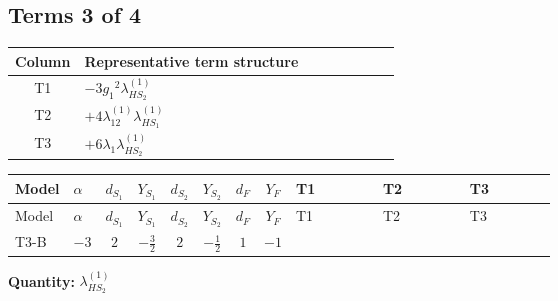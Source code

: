 \documentclass[8pt]{article}
\begin{document}
\begin{landscape}
\subsection*{Terms 3 of 4}
\begin{center}
\begin{tabular}{@{}c >{\raggedright\arraybackslash}p{0.82\linewidth}@{}}
\toprule
Column & Representative term structure \\
\midrule
T1 & \(\displaystyle -3 {g_1}^2 {\lambda_{HS_2}^{(1)}}\) \\
\midrule
T2 & \(\displaystyle +4 {\lambda_{12}^{(1)}} {\lambda_{HS_1}^{(1)}}\) \\
\midrule
T3 & \(\displaystyle +6 {\lambda_1} {\lambda_{HS_2}^{(1)}}\) \\
\midrule
\bottomrule
\end{tabular}
\end{center}
\smallskip
\tiny
\begin{longtable}{@{}llcccccc >{\raggedright\arraybackslash}p{0.21\linewidth} >{\raggedright\arraybackslash}p{0.21\linewidth} >{\raggedright\arraybackslash}p{0.21\linewidth}@{}}
\toprule
Model & $\alpha$ & $d_{S_1}$ & $Y_{S_1}$ & $d_{S_2}$ & $Y_{S_2}$ & $d_F$ & $Y_F$ & T1 & T2 & T3 \\
\midrule
\endfirsthead
\toprule
Model & $\alpha$ & $d_{S_1}$ & $Y_{S_1}$ & $d_{S_2}$ & $Y_{S_2}$ & $d_F$ & $Y_F$ & T1 & T2 & T3 \\
\midrule
\endhead
T3-B & $-3$ & $2$ & $-\frac{3}{2}$ & $2$ & $-\frac{1}{2}$ & $1$ & $-1$ & \scriptsize\adjustbox{max width=\linewidth}{$\begin{gathered} -3 {g_1}^2 {\lambda_{HS_2}^{(1)}}\end{gathered}$} & \scriptsize\adjustbox{max width=\linewidth}{$\begin{gathered} +4 {\lambda_{12}^{(1)}} {\lambda_{HS_1}^{(1)}}\end{gathered}$} & \scriptsize\adjustbox{max width=\linewidth}{$\begin{gathered} +6 {\lambda_1} {\lambda_{HS_2}^{(1)}}\end{gathered}$} \\
\midrule
\bottomrule
\end{longtable}
\clearpage
\noindent\textbf{Quantity: }$\lambda_{HS_2}^{(1)}$\par\smallskip

\end{landscape}
\end{document}
